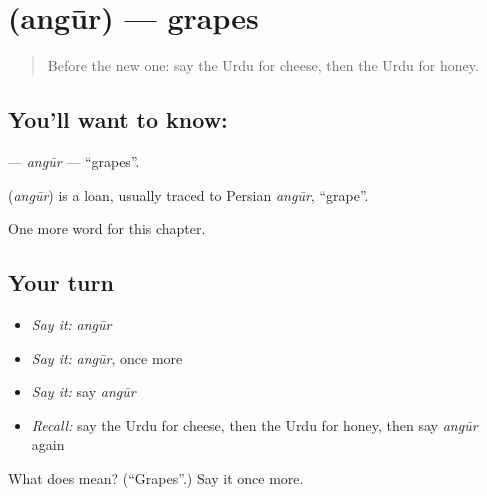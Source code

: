 \section[\texorpdfstring{\ur{انگور} (angūr)}{انگور (angūr)}]{ (angūr) — grapes}

\label{lesson:UR-C56-angur}



\begin{quote}
Before the new one: say the Urdu for cheese, then the Urdu for honey.
\end{quote}

\subsection*{You'll want to know: }
\textbf{} — \emph{angūr} — \textquotedblleft{}grapes\textquotedblright{}.

\begin{cousinweb}
\textbf{} (\emph{angūr}) is a loan, usually traced to Persian \emph{angūr}, \textquotedblleft{}grape\textquotedblright{}.
\end{cousinweb}

\begin{grammarlens}[title={What you've built}]
One more word for this chapter.
\end{grammarlens}

\subsection*{Your turn}
\begin{itemize}
\raggedright
  \item \emph{Say it:} \emph{angūr}
  \item \emph{Say it:} \emph{angūr}, once more
  \item \emph{Say it:} say \emph{angūr}
  \item \emph{Recall:} say the Urdu for cheese, then the Urdu for honey, then say \emph{angūr} again
\end{itemize}

\begin{tcolorbox}[breakable,colback=teal!4,colframe=teal!35!black,title={Before you move on}]
What does  mean? (\textquotedblleft{}Grapes\textquotedblright{}.) Say it once more.
\end{tcolorbox}
